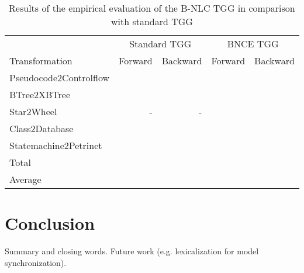 \documentclass[]{report}
\begin{document}


\begin{table}[h]
	\centering
	\begin{tabular}{l r r r r }
			& \multicolumn{2}{c}{Standard TGG} & \multicolumn{2}{c}{BNCE TGG}\\
		Transformation 	& Forward & Backward & Forward & Backward \\
		\hline
		Pseudocode2Controlflow	& 		& 		& 	 	&  \\
		BTree2XBTree			&  		& 		& 		&  \\
		Star2Wheel				& -		& -		& 	 	&  \\
		Class2Database			& 		& 		&  		&   \\
		Statemachine2Petrinet	& 		& 		& 		&  \\
		\hline
		Total					&  & 		&	& \\
		Average					&  & 		&	& \\
	\end{tabular}
	\caption{Results of the empirical evaluation of the B-NLC TGG in comparison with standard TGG}
	\label{tab:evaluation}
\end{table}

\section{Conclusion}
Summary and closing words. Future work (e.g. lexicalization for model synchronization).




\end{document}
